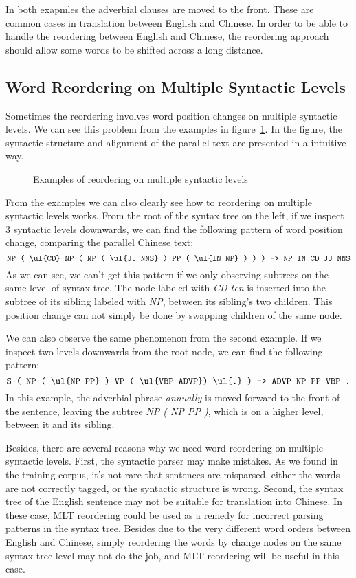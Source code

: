 In both exapmles the adverbial clauses are moved to the front. These are common cases in translation between English and Chinese. In order to be able to handle the reordering between English and Chinese, the reordering approach should allow some words to be shifted across a long distance.

\subsection{Word Reordering on Multiple Syntactic Levels}

Sometimes the reordering involves word position changes on multiple syntactic levels. We can see this problem from the examples in figure~\ref{unstructured}. In the figure, the syntactic structure and alignment of the parallel text are presented in a intuitive way.

\begin{figure}[H]
\centering
\subfigure {

}
\subfigure {

}
\caption{Examples of reordering on multiple syntactic levels}
\label{unstructured}
\end{figure}

From the examples we can also clearly see how to reordering on multiple syntactic levels works. From the root of the syntax tree on the left, if we inspect 3 syntactic levels downwards, we can find the following pattern of word position change, comparing the parallel Chinese text:
$$\texttt{NP ( \ul{CD} NP ( NP ( \ul{JJ NNS} ) PP ( \ul{IN NP} ) ) ) -> NP IN CD JJ NNS}$$
As we can see, we can't get this pattern if we only observing subtrees on the same level of syntax tree. The node labeled with \emph{CD ten} is inserted into the subtree of its sibling labeled with \emph{NP}, between its sibling's two children. This position change can not simply be done by swapping children of the same node.

We can also observe the same phenomenon from the second example. If we inspect two levels downwards from the root node, we can find the following pattern:
$$\texttt{S ( NP ( \ul{NP PP} ) VP ( \ul{VBP ADVP}) \ul{.} ) -> ADVP NP PP VBP .}$$
In this example, the adverbial phrase \emph{annually} is moved forward to the front of the sentence, leaving the subtree \emph{NP ( NP PP )}, which is on a higher level, between it and its sibling.

Besides, there are several reasons why we need word reordering on multiple syntactic levels. First, the syntactic parser may make mistakes. As we found in the training corpus, it's not rare that sentences are misparsed, either the words are not correctly tagged, or the syntactic structure is wrong. Second, the syntax tree of the English sentence may not be suitable for translation into Chinese. In these case, MLT reordering could be used as a remedy for incorrect parsing patterns in the syntax tree. Besides due to the very different word orders between English and Chinese, simply reordering the words by change nodes on the same syntax tree level may not do the job, and MLT reordering will be useful in this case.

